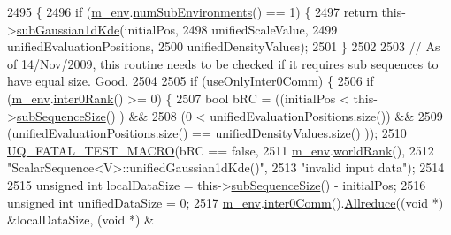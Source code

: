 \begin{DoxyCode}
2495 \{
2496   \textcolor{keywordflow}{if} (\hyperlink{class_q_u_e_s_o_1_1_scalar_sequence_a71618cd6351b29361b437af68447a4c8}{m\_env}.\hyperlink{class_q_u_e_s_o_1_1_base_environment_ac0345f57e31ef7833e379ed972bd094d}{numSubEnvironments}() == 1) \{
2497     \textcolor{keywordflow}{return} this->\hyperlink{class_q_u_e_s_o_1_1_scalar_sequence_af16ce4767da1bfe61f40652d3fb6d418}{subGaussian1dKde}(initialPos,
2498                                   unifiedScaleValue,
2499                                   unifiedEvaluationPositions,
2500                                   unifiedDensityValues);
2501   \}
2502 
2503   \textcolor{comment}{// As of 14/Nov/2009, this routine needs to be checked if it requires sub sequences to have equal size.
       Good.}
2504 
2505   \textcolor{keywordflow}{if} (useOnlyInter0Comm) \{
2506     \textcolor{keywordflow}{if} (\hyperlink{class_q_u_e_s_o_1_1_scalar_sequence_a71618cd6351b29361b437af68447a4c8}{m\_env}.\hyperlink{class_q_u_e_s_o_1_1_base_environment_ae106b5bb8a80b655b88b3a26b1e7c185}{inter0Rank}() >= 0) \{
2507       \textcolor{keywordtype}{bool} bRC = ((initialPos                        <  this->\hyperlink{class_q_u_e_s_o_1_1_scalar_sequence_a0288ea295eedc216a1617b3286f6f3a0}{subSequenceSize}()          ) 
      &&
2508                   (0                                 <  unifiedEvaluationPositions.size()) &&
2509                   (unifiedEvaluationPositions.size() == unifiedDensityValues.size()      ));
2510       \hyperlink{_defines_8h_a56d63d18d0a6d45757de47fcc06f574d}{UQ\_FATAL\_TEST\_MACRO}(bRC == \textcolor{keyword}{false},
2511                           \hyperlink{class_q_u_e_s_o_1_1_scalar_sequence_a71618cd6351b29361b437af68447a4c8}{m\_env}.\hyperlink{class_q_u_e_s_o_1_1_base_environment_a78b57112bbd0e6dd0e8afec00b40ffa7}{worldRank}(),
2512                           \textcolor{stringliteral}{"ScalarSequence<V>::unifiedGaussian1dKde()"},
2513                           \textcolor{stringliteral}{"invalid input data"});
2514 
2515       \textcolor{keywordtype}{unsigned} \textcolor{keywordtype}{int} localDataSize = this->\hyperlink{class_q_u_e_s_o_1_1_scalar_sequence_a0288ea295eedc216a1617b3286f6f3a0}{subSequenceSize}() - initialPos;
2516       \textcolor{keywordtype}{unsigned} \textcolor{keywordtype}{int} unifiedDataSize = 0;
2517       \hyperlink{class_q_u_e_s_o_1_1_scalar_sequence_a71618cd6351b29361b437af68447a4c8}{m\_env}.\hyperlink{class_q_u_e_s_o_1_1_base_environment_a689e4d140c74d495d97eb498714a4b82}{inter0Comm}().\hyperlink{class_q_u_e_s_o_1_1_mpi_comm_a72e137e60ef8060efb1ee5fc874fa4b8}{Allreduce}((\textcolor{keywordtype}{void} *) &localDataSize, (\textcolor{keywordtype}{void} *) &

\end{DoxyCode}

